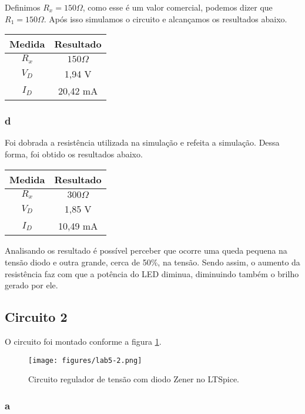 \documentclass[a4paper]{report}
\begin{document}
Definimos $R_x = 150 \Omega$, como esse é um valor comercial, podemos dizer que $R_1 = 150 \Omega$. Após isso simulamos o circuito e alcançamos os resultados abaixo.

\begin{table}[H]
    \centering
    \begin{tabular}{c | c}
	Medida & Resultado \\
	\hline
	$R_{x}$ & $150 \Omega$ \\
	$V_{D}$ & 1,94 V \\
	$I_{D}$ & 20,42 mA
\end{tabular}
\end{table}

\subsubsection*{d}
Foi dobrada a resistência utilizada na simulação e refeita a simulação. Dessa forma, foi obtido os resultados abaixo.

\begin{table}[H]
    \centering
    \begin{tabular}{c | c}
	Medida & Resultado \\
	\hline
	$R_{x}$ & $300 \Omega$ \\
	$V_{D}$ & 1,85 V \\
	$I_{D}$ & 10,49 mA
\end{tabular}
\end{table}

Analisando os resultado é possível perceber que ocorre uma queda pequena na tensão diodo e outra grande, cerca de 50\%, na tensão. Sendo assim, o aumento da resistência faz com que a potência do LED diminua, diminuindo também o brilho gerado por ele.

\subsection*{Circuito 2}

O circuito foi montado conforme a figura \ref{fig:figures-lab5_1-png}.

\begin{figure}[H]
    \centering
    \texttt{[image: figures/lab5-2.png]}
    \caption{Circuito regulador de tensão com diodo Zener no LTSpice.}
    \label{fig:figures-lab5_1-png}
\end{figure}

\subsubsection*{a}
\end{document}
